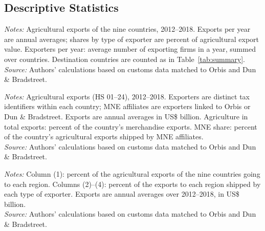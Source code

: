 \documentclass[11pt,a4paper]{article}
\newcommand{\srcnote}{\textit{Source:} Authors' calculations based on customs data matched to Orbis and Dun \& Bradstreet.}
\begin{document}
\subsection{Descriptive Statistics}
\begin{table}[H]\centering\small%
  \caption{Agricultural Sample Summary, Annual Averages 2012--2018}%
  \label{tab:ap_summary}%
  \par\vspace{3pt}%
  \begin{minipage}{0.95\textwidth}\footnotesize %
  \textit{Notes:} Agricultural exports of the nine countries, 2012--2018. Exports per year are annual averages; shares by type of exporter are percent of agricultural export value. Exporters per year: average number of exporting firms in a year, summed over countries. Destination countries are counted as in Table~\ref{tab:summary}.\\[3pt]%
  \srcnote%
  \end{minipage}%
  \end{table}
\begin{table}[H]\centering\footnotesize%
  \caption{Agricultural Exports, by Exporting Country, Annual Averages 2012--2018}%
  \label{tab:ap_sample}%
  \par\vspace{3pt}%
  \begin{minipage}{0.95\textwidth}\footnotesize %
  \textit{Notes:} Agricultural exports (HS 01--24), 2012--2018. Exporters are distinct tax identifiers within each country; MNE affiliates are exporters linked to Orbis or Dun \& Bradstreet. Exports are annual averages in US\$ billion. Agriculture in total exports: percent of the country's merchandise exports. MNE share: percent of the country's agricultural exports shipped by MNE affiliates.\\[3pt]%
  \srcnote%
  \end{minipage}%
  \end{table}
\begin{table}[H]\centering\small%
  \caption{Agricultural Exports and Ownership, by Destination Region, Annual Averages 2012--2018}%
  \label{tab:ap_desttab}%
  \par\vspace{3pt}%
  \begin{minipage}{0.95\textwidth}\footnotesize %
  \textit{Notes:} Column (1): percent of the agricultural exports of the nine countries going to each region. Columns (2)--(4): percent of the exports to each region shipped by each type of exporter. Exports are annual averages over 2012--2018, in US\$ billion.\\[3pt]%
  \srcnote%
  \end{minipage}%
  \end{table}
\end{document}
